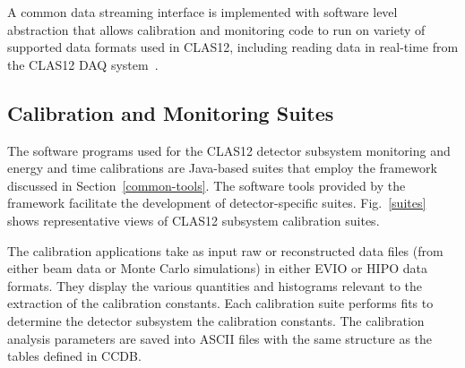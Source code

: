 A common data streaming interface is implemented with software level abstraction that allows calibration and monitoring
code to run on variety of supported data formats used in CLAS12, including reading data in real-time from the CLAS12 DAQ system~\cite{daq-nim}.


\subsection{Calibration and Monitoring Suites}

The software programs used for the CLAS12 detector subsystem monitoring and energy and time calibrations are
Java-based suites that employ the framework discussed in Section~\ref{common-tools}.
The software tools provided by the framework facilitate the development of
detector-specific suites. Fig.~\ref{suites} shows representative views of CLAS12 subsystem calibration suites.

The calibration applications take as input raw or reconstructed data files
(from either beam data or Monte Carlo simulations) in
either EVIO or HIPO data formats.  They display the various quantities and histograms relevant to the
extraction of the calibration constants.  Each calibration suite performs fits to determine the detector subsystem
the calibration constants.  The calibration analysis parameters are saved into ASCII files
with the same structure as the tables defined in CCDB.


